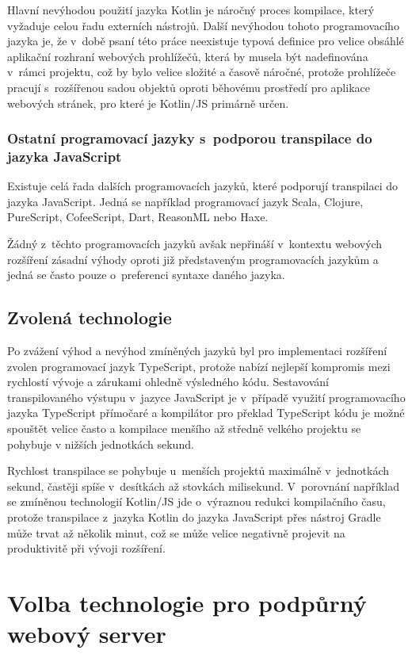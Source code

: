 Hlavní nevýhodou použití jazyka Kotlin je náročný proces kompilace, který vyžaduje celou řadu externích nástrojů. Další nevýhodou tohoto programovacího jazyka je, že v~době psaní této práce neexistuje typová definice pro velice obsáhlé aplikační rozhraní webových prohlížečů, která by musela být nadefinována v~rámci projektu, což by bylo velice složité a časově náročné, protože prohlížeče pracují s~rozšířenou sadou objektů oproti běhovému prostředí pro aplikace webových stránek, pro které je Kotlin/JS primárně určen.

\subsubsection{Ostatní programovací jazyky s~podporou transpilace do jazyka JavaScript}

Existuje celá řada dalších programovacích jazyků, které podporují transpilaci do jazyka JavaScript. Jedná se například programovací jazyk Scala, Clojure, PureScript, CofeeScript, Dart, ReasonML nebo Haxe.

Žádný z~těchto programovacích jazyků avšak nepřináší v~kontextu webových rozšíření zásadní výhody oproti již představeným programovacích jazykům a jedná se často pouze o~preferenci syntaxe daného jazyka.

\subsection{Zvolená technologie}

Po zvážení výhod a nevýhod zmíněných jazyků byl pro implementaci rozšíření zvolen programovací jazyk TypeScript, protože nabízí nejlepší kompromis mezi rychlostí vývoje a zárukami ohledně výsledného kódu. Sestavování transpilovaného výstupu v~jazyce JavaScript je v~případě využití programovacího jazyka TypeScript přímočaré a kompilátor pro překlad TypeScript kódu je možné spouštět velice často a kompilace menšího až středně velkého projektu se pohybuje v nižších jednotkách sekund. 

Rychlost transpilace se pohybuje u~menších projektů maximálně v~jednotkách sekund, častěji spíše v~desítkách až stovkách milisekund. V~porovnání například se zmíněnou technologií Kotlin/JS jde o~výraznou redukci kompilačního času, protože transpilace z~jazyka Kotlin do jazyka JavaScript přes nástroj Gradle může trvat až několik minut, což se může velice negativně projevit na produktivitě při vývoji rozšíření.

\section{Volba technologie pro podpůrný webový server}

